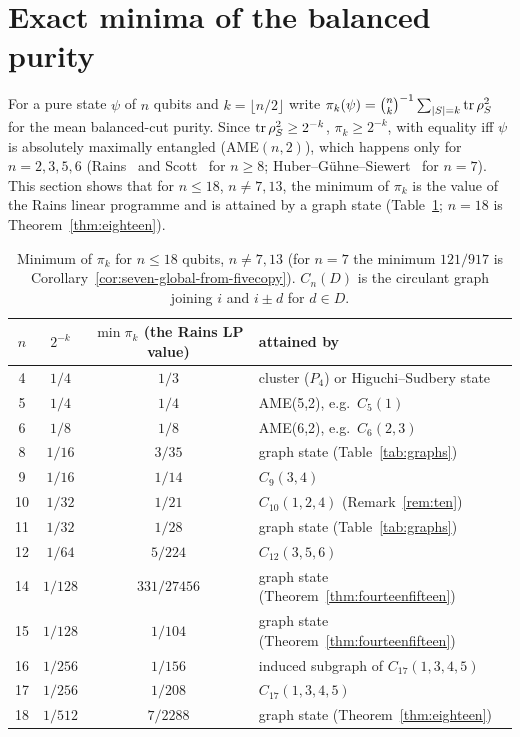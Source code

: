 \section{Exact minima of the balanced purity}\label{sec:lp}

For a pure state $\psi$ of $n$ qubits and $k=\lfloor n/2\rfloor$ write
$\pi_k(\psi)=\binom nk^{-1}\sum_{|S|=k}\operatorname{tr}\rho_S^2$ for the mean balanced-cut purity. Since
$\operatorname{tr}\rho_S^2\ge2^{-k}$, $\pi_k\ge2^{-k}$, with equality iff $\psi$ is absolutely maximally entangled
(AME$(n,2)$), which happens only for $n=2,3,5,6$ (Rains~\cite{Rains} and Scott~\cite{Scott} for $n\ge8$;
Huber--G\"uhne--Siewert~\cite{HGS} for $n=7$). This section shows that for $n\le18$, $n\ne7,13$,
the minimum of $\pi_k$ is the value of the Rains linear programme and is attained by a graph state
(Table~\ref{tab:minima}; $n=18$ is Theorem~\ref{thm:eighteen}).

\begin{table}[htbp]
\centering
\begin{tabular}{@{}cccl@{}}
\toprule
$n$ & $2^{-k}$ & $\min\pi_k$ (the Rains LP value) & attained by \\
\midrule
4 & $1/4$ & $1/3$ & cluster ($P_4$) or Higuchi--Sudbery state\\
5 & $1/4$ & $1/4$ & AME(5,2), e.g.\ $C_5(1)$\\
6 & $1/8$ & $1/8$ & AME(6,2), e.g.\ $C_6(2,3)$\\
8 & $1/16$ & $3/35$ & graph state (Table~\ref{tab:graphs})\\
9 & $1/16$ & $1/14$ & $C_9(3,4)$\\
10 & $1/32$ & $1/21$ & $C_{10}(1,2,4)$ (Remark~\ref{rem:ten})\\
11 & $1/32$ & $1/28$ & graph state (Table~\ref{tab:graphs})\\
12 & $1/64$ & $5/224$ & $C_{12}(3,5,6)$\\
14 & $1/128$ & $331/27456$ & graph state (Theorem~\ref{thm:fourteenfifteen})\\
15 & $1/128$ & $1/104$ & graph state (Theorem~\ref{thm:fourteenfifteen})\\
16 & $1/256$ & $1/156$ & induced subgraph of $C_{17}(1,3,4,5)$\\
17 & $1/256$ & $1/208$ & $C_{17}(1,3,4,5)$\\
18 & $1/512$ & $7/2288$ & graph state (Theorem~\ref{thm:eighteen})\\
\bottomrule
\end{tabular}
\caption{Minimum of $\pi_k$ for $n\le18$ qubits, $n\ne7,13$ (for $n=7$ the minimum $121/917$ is
Corollary~\ref{cor:seven-global-from-fivecopy}). $C_n(D)$ is the circulant graph joining $i$ and $i\pm d$ for $d\in D$.}
\label{tab:minima}
\end{table}

